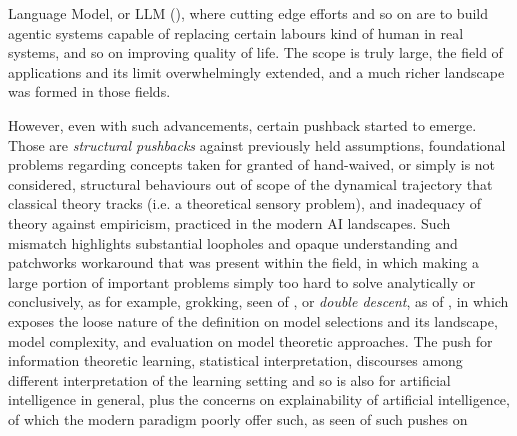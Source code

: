 Language Model, or LLM (\cite{vaswani2017attention,devlin2019bert,brown2020language,zhao2023llmsurvey,zhao2024llmsurvey2,radford2019language,radford2018improving,raffel2020exploring,touvron2023llama,touvron2023llama2,chowdhery2022palm,ouyang2022training,wei2022chain,kaplan2020scalinglawsneurallanguage,hoffmann2022training,bai2022constitutional}), where cutting edge efforts and so on are to build agentic systems capable of replacing certain labours kind of human in real systems, and so on improving quality of life. The scope is truly large, the field of applications and its limit overwhelmingly extended, and a much richer landscape was formed in those fields.

However, even with such advancements, certain pushback started to emerge. Those are \textit{structural pushbacks} against previously held assumptions, foundational problems regarding concepts taken for granted of hand-waived, or simply is not considered, structural behaviours out of scope of the dynamical trajectory that classical theory tracks (i.e. a theoretical sensory problem), and inadequacy of theory against empiricism, practiced in the modern AI landscapes. Such mismatch highlights substantial loopholes and opaque understanding and patchworks workaround that was present within the field, in which making a large portion of important problems simply too hard to solve analytically or conclusively, as for example, grokking, seen of \cite{power2022grokkinggeneralizationoverfittingsmall}, or \textit{double descent}, as of \cite{belkin_reconciling_2019,nakkiran_deep_2019}, in which exposes the loose nature of the definition on model selections and its landscape, model complexity, and evaluation on model theoretic approaches. The push for information theoretic learning, statistical interpretation, discourses among different interpretation of the learning setting and so is also for artificial intelligence in general, plus the concerns on explainability of artificial intelligence, of which the modern paradigm poorly offer such, as seen of such pushes on \cite{doshi2017towards,lipton2018mythos,ribeiro2016should,lundberg2017shap,molnar2020interpretable}
